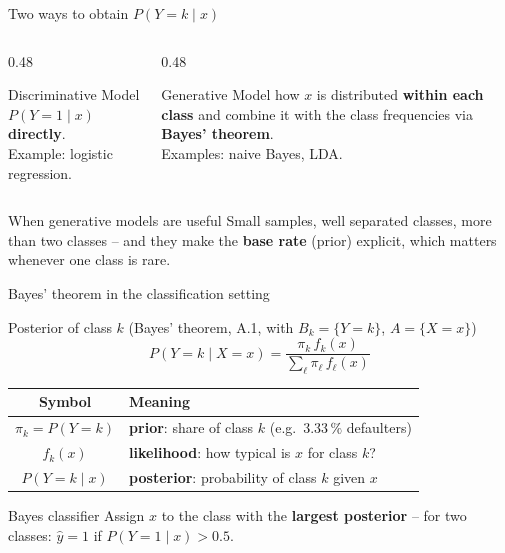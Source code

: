 \documentclass[aspectratio=169,11pt]{beamer}
\begin{document}
\begin{frame}{Two ways to obtain $P(Y=k\mid x)$}
  \begin{columns}[T]
    \begin{column}{0.48\textwidth}
      \begin{block}{Discriminative}
        Model $P(Y=1\mid x)$ \textbf{directly}.\\[2pt]
        Example: logistic regression.
      \end{block}
    \end{column}
    \begin{column}{0.48\textwidth}
      \begin{block}{Generative}
        Model how $x$ is distributed \textbf{within each class} and combine
        it with the class frequencies via \textbf{Bayes' theorem}.\\[2pt]
        Examples: naive Bayes, LDA.
      \end{block}
    \end{column}
  \end{columns}
  \medskip
  \begin{exampleblock}{When generative models are useful}
    Small samples, well separated classes, more than two classes -- and
    they make the \textbf{base rate} (prior) explicit, which matters
    whenever one class is rare.
  \end{exampleblock}
\end{frame}

\begin{frame}{Bayes' theorem in the classification setting}
  \begin{block}{Posterior of class $k$ (Bayes' theorem, A.1, with $B_k=\{Y=k\}$, $A=\{X=x\}$)}
    \[
      P(Y=k\mid X=x)=\frac{\pi_k\,f_k(x)}{\sum_{\ell}\pi_\ell\,f_\ell(x)}
    \]
  \end{block}
  \begin{center}
    \renewcommand{\arraystretch}{1.25}
    \begin{tabular}{@{}cl@{}}
      \toprule
      \textbf{Symbol} & \textbf{Meaning}\\
      \midrule
      $\pi_k=P(Y=k)$ & \textbf{prior}: share of class $k$ (e.g.\ $3.33\,\%$ defaulters)\\
      $f_k(x)$ & \textbf{likelihood}: how typical is $x$ for class $k$?\\
      $P(Y=k\mid x)$ & \textbf{posterior}: probability of class $k$ given $x$\\
      \bottomrule
    \end{tabular}
  \end{center}
  \begin{block}{Bayes classifier}
    Assign $x$ to the class with the \textbf{largest posterior} -- for two
    classes: $\hat y=1$ if $P(Y=1\mid x)>0.5$.
  \end{block}
\end{frame}
\end{document}
